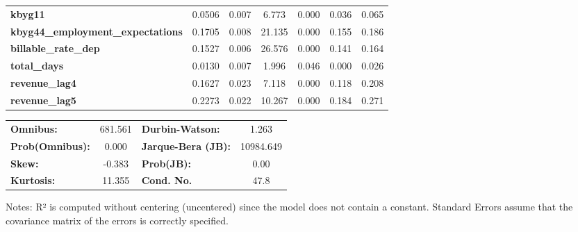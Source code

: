 \begin{center}
\begin{tabular}{lcccccc}
\textbf{kbyg11}                           &       0.0506  &        0.007     &     6.773  &         0.000        &        0.036    &        0.065     \\
\textbf{kbyg44\_employment\_expectations} &       0.1705  &        0.008     &    21.135  &         0.000        &        0.155    &        0.186     \\
\textbf{billable\_rate\_dep}              &       0.1527  &        0.006     &    26.576  &         0.000        &        0.141    &        0.164     \\
\textbf{total\_days}                      &       0.0130  &        0.007     &     1.996  &         0.046        &        0.000    &        0.026     \\
\textbf{revenue\_lag4}                    &       0.1627  &        0.023     &     7.118  &         0.000        &        0.118    &        0.208     \\
\textbf{revenue\_lag5}                    &       0.2273  &        0.022     &    10.267  &         0.000        &        0.184    &        0.271     \\
\bottomrule
\end{tabular}
\begin{tabular}{lclc}
\textbf{Omnibus:}       & 681.561 & \textbf{  Durbin-Watson:     } &     1.263  \\
\textbf{Prob(Omnibus):} &   0.000 & \textbf{  Jarque-Bera (JB):  } & 10984.649  \\
\textbf{Skew:}          &  -0.383 & \textbf{  Prob(JB):          } &      0.00  \\
\textbf{Kurtosis:}      &  11.355 & \textbf{  Cond. No.          } &      47.8  \\
\bottomrule
\end{tabular}
\end{center}

Notes: \newline
 [1] R² is computed without centering (uncentered) since the model does not contain a constant. \newline
 [2] Standard Errors assume that the covariance matrix of the errors is correctly specified.